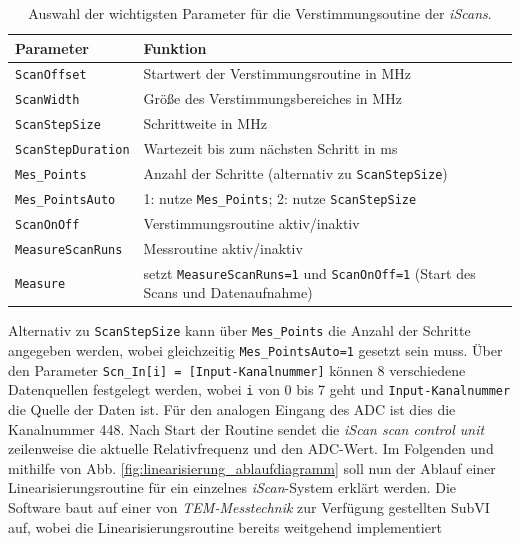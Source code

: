 \begin{table}
	\begin{tabular}{p{}p{}}
		\toprule
			Parameter & Funktion \\
		\midrule[1px]
		\hline
			\lstinline|ScanOffset| & Startwert der Verstimmungsroutine in MHz\\
			\lstinline|ScanWidth| & Größe des Verstimmungsbereiches in MHz\\
			\lstinline|ScanStepSize| & Schrittweite in MHz\\
			\lstinline|ScanStepDuration| & Wartezeit bis zum nächsten Schritt in ms\\
			\lstinline|Mes_Points| & Anzahl der Schritte (alternativ zu
			\lstinline|ScanStepSize|)\\
			\lstinline|Mes_PointsAuto| & 1: nutze \lstinline|Mes_Points|; 2: nutze
			\lstinline|ScanStepSize|\\
			\lstinline|ScanOnOff| & Verstimmungsroutine aktiv/inaktiv\\
			\lstinline|MeasureScanRuns| & Messroutine aktiv/inaktiv\\
			\lstinline|Measure| & setzt
			\lstinline|MeasureScanRuns=1| und \lstinline|ScanOnOff=1| (Start des Scans
			und Datenaufnahme)\\
		\bottomrule[1px]
	\end{tabular}
	\caption[Parameter der Verstimmungsoutine]{Auswahl der wichtigsten Parameter
	für die Verstimmungsoutine der \textit{iScans}.}
	\label{tab:verstimmungsroutine_parameter}
\end{table}
Alternativ zu \lstinline|ScanStepSize| kann über \lstinline|Mes_Points| die
Anzahl der Schritte angegeben werden, wobei gleichzeitig
\lstinline|Mes_PointsAuto=1| gesetzt sein muss. Über den Parameter
\lstinline|Scn_In[i] = [Input-Kanalnummer]| können 8
verschiedene Datenquellen festgelegt werden, wobei
\lstinline|i| von 0 bis 7 geht und \lstinline|Input-Kanalnummer| die Quelle
der Daten ist. Für den analogen Eingang des ADC ist dies die Kanalnummer 448.
Nach Start der Routine sendet die \textit{iScan scan control unit} zeilenweise
die aktuelle Relativfrequenz und den ADC-Wert. Im Folgenden und mithilfe von
Abb. \ref{fig:linearisierung_ablaufdiagramm} soll nun der Ablauf einer
Linearisierungsroutine für ein einzelnes \textit{iScan}-System erklärt werden.
Die Software baut auf einer von \textit{TEM-Messtechnik} zur Verfügung gestellten
SubVI auf, wobei die Linearisierungsroutine bereits weitgehend implementiert
